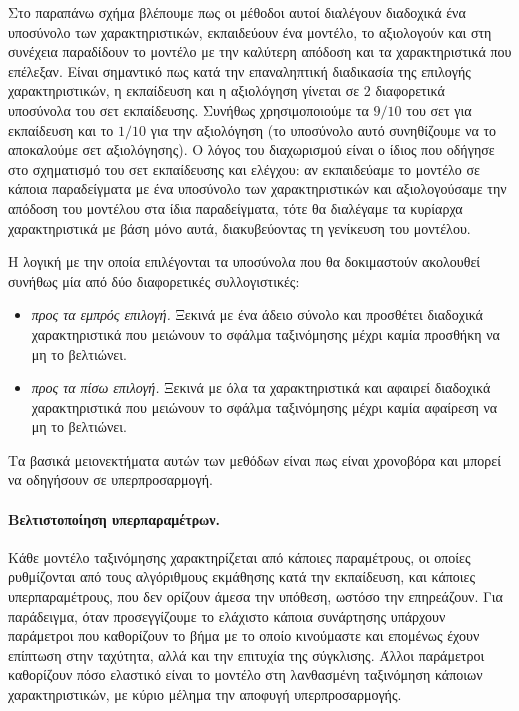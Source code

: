 \documentclass{article}
\begin{document}
 Στο παραπάνω σχήμα βλέπουμε πως οι μέθοδοι αυτοί διαλέγουν διαδοχικά ένα υποσύνολο των χαρακτηριστικών, εκπαιδεύουν ένα μοντέλο, το αξιολογούν και στη συνέχεια παραδίδουν το μοντέλο με την καλύτερη απόδοση και τα χαρακτηριστικά που επέλεξαν. Είναι σημαντικό πως κατά την επαναληπτική διαδικασία της επιλογής χαρακτηριστικών, η εκπαίδευση και η αξιολόγηση γίνεται σε $2$ διαφορετικά υποσύνολα του σετ εκπαίδευσης. Συνήθως χρησιμοποιούμε τα $9/10$ του σετ για εκπαίδευση και το $1/10$ για την αξιολόγηση (το υποσύνολο αυτό συνηθίζουμε να το αποκαλούμε σετ αξιολόγησης). Ο λόγος του διαχωρισμού είναι ο ίδιος που οδήγησε στο σχηματισμό του σετ εκπαίδευσης και ελέγχου: αν εκπαιδεύαμε το μοντέλο σε κάποια παραδείγματα με ένα υποσύνολο των χαρακτηριστικών και αξιολογούσαμε την απόδοση του μοντέλου στα ίδια παραδείγματα, τότε θα διαλέγαμε τα κυρίαρχα χαρακτηριστικά με βάση μόνο αυτά, διακυβεύοντας τη γενίκευση του μοντέλου.
 
 Η λογική με την οποία επιλέγονται τα υποσύνολα που θα δοκιμαστούν ακολουθεί συνήθως μία από δύο διαφορετικές συλλογιστικές:
 \begin{itemize}
 \item \textit{προς τα εμπρός επιλογή.} Ξεκινά με ένα άδειο σύνολο και προσθέτει διαδοχικά χαρακτηριστικά που μειώνουν το σφάλμα ταξινόμησης μέχρι καμία προσθήκη να μη το βελτιώνει.
 \item \textit{προς τα πίσω επιλογή.} Ξεκινά με όλα τα χαρακτηριστικά και αφαιρεί διαδοχικά χαρακτηριστικά που μειώνουν το σφάλμα ταξινόμησης μέχρι καμία αφαίρεση να μη το βελτιώνει.
 \end{itemize}
 Τα βασικά μειονεκτήματα αυτών των μεθόδων είναι πως είναι χρονοβόρα και μπορεί να οδηγήσουν σε υπερπροσαρμογή.
 
 \paragraph{Βελτιστοποίηση υπερπαραμέτρων.} Κάθε μοντέλο ταξινόμησης χαρακτηρίζεται από κάποιες παραμέτρους, οι οποίες ρυθμίζονται από τους αλγόριθμους εκμάθησης κατά την εκπαίδευση, και κάποιες υπερπαραμέτρους, που δεν ορίζουν άμεσα την υπόθεση, ωστόσο την επηρεάζουν. Για παράδειγμα, όταν προσεγγίζουμε το ελάχιστο κάποια συνάρτησης υπάρχουν παράμετροι που καθορίζουν το βήμα με το οποίο κινούμαστε και επομένως έχουν επίπτωση στην ταχύτητα, αλλά και την επιτυχία της σύγκλισης. Άλλοι παράμετροι καθορίζουν πόσο ελαστικό είναι το μοντέλο στη λανθασμένη ταξινόμηση κάποιων χαρακτηριστικών, με κύριο μέλημα την αποφυγή υπερπροσαρμογής.
 
\end{document}
